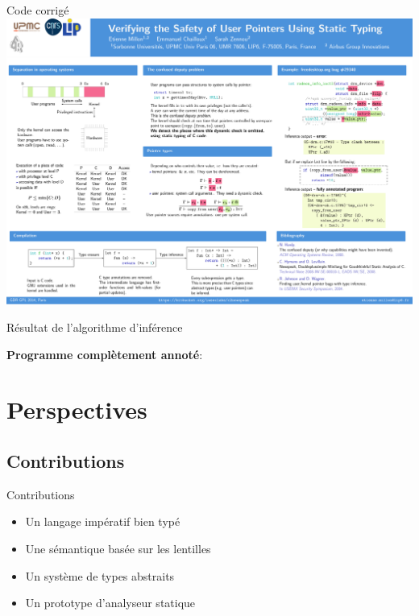 \documentclass{beamer}
\def\codeout#1{
    \begin{center}
    \fboxsep=2mm
    \colorbox{codeoutcol}{\BUseVerbatim{#1}}
    \end{center}
}
\begin{document}
\begin{frame}{Code corrigé}
    \includegraphics[trim=2300 990 100 1220,clip,width=\textwidth]{poster.pdf}
\end{frame}

\begin{frame}[fragile]{Résultat de l'algorithme d'inférence}

\textbf{Programme complètement annoté}:


\codeout{drmok}
\end{frame}

\section{Perspectives}

\subsection{Contributions}

\begin{frame}{Contributions}
\begin{itemize}
\item Un langage impératif bien typé
\item Une sémantique basée sur les lentilles
\item Un système de types abstraits
\item Un prototype d'analyseur statique
\end{itemize}
\end{frame}
\end{document}
